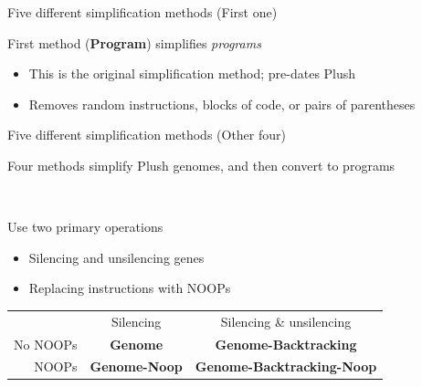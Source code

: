 \documentclass{beamer}
\begin{document}
\begin{frame}{Five different simplification methods (First one)}

First method (\textbf{Program}) simplifies \emph{programs}
\begin{itemize}
	\item This is the original simplification method; pre-dates Plush
	\item Removes random instructions, blocks of code, or pairs of parentheses
\end{itemize}

\end{frame}

\begin{frame}{Five different simplification methods (Other four)}

Four methods simplify Plush genomes, and then convert to programs

~

Use two primary operations
\begin{itemize}
	\item Silencing and unsilencing genes
	\item Replacing instructions with NOOPs
\end{itemize}

\begin{center}
\begin{tabular}{rcc} %
	&  Silencing & Silencing \& unsilencing \\ 
	No NOOPs & \textbf{Genome} & \textbf{Genome-Backtracking} \\ 
	NOOPs & \textbf{Genome-Noop} & \textbf{Genome-Back\-tracking-Noop } \\ 
\end{tabular} 
\end{center}


\end{frame}
\end{document}
